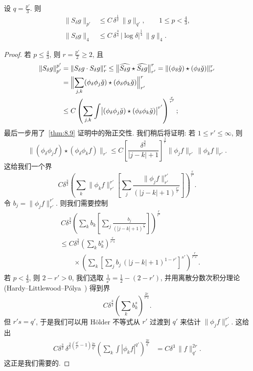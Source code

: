 \begin{theorem}\label{thm:8.11}
设 $q=\frac{p'}{3}$. 则
\begin{align*}
\|S_{\delta}g\|_{p'}&\leq C\,\delta^{\frac{1}{q}}\,\|g\|_{q'},\qquad 1\leq p<\frac{4}{3}, \\
\|S_{\delta}g\|_{4}&\leq C\,\delta^{\frac{3}{4}}\,|\log\delta|^{\frac{1}{4}}\,\|g\|_{4}.
\end{align*}
\end{theorem}

\begin{proof}
若 $p\leq\frac{4}{3}$, 则 $r=\frac{p'}{2}\geq 2$, 且
\begin{align*}
\|S_{\delta}g\|_{p'}^{p'}
&=\|S_{\delta}g\cdot S_{\delta}g\|_{r}^{r}
\leq\bigl\|\widehat{S_{\delta}g}\star\widehat{S_{\delta}g}\bigr\|_{r'}^{r}
=\|(\phi_{\delta}\check{g})\star(\phi_{\delta}\check{g})\|_{r'}^{r} \\
&=\Bigl\|\sum_{j,k}(\phi_{\delta}\phi_{j}\check{g})\star(\phi_{\delta}\phi_{k}\check{g})\Bigr\|_{r'}^{r} \\
&\leq C\left(\sum_{j,k}\int\bigl|(\phi_{\delta}\phi_{j}\check{g})\star(\phi_{\delta}\phi_{k}\check{g})\bigr|^{r'}\right)^{\frac{r}{r'}};
\end{align*}
最后一步用了~\ref*{thm:8.9} 证明中的殆正交性. 我们稍后将证明: 若 $1\leq r'\leq\infty$, 则
\[
\bigl\|(\phi_{\delta}\phi_{j}f)\star(\phi_{\delta}\phi_{k}f)\bigr\|_{r'}
\leq C\left[\frac{\delta^{\frac{3}{2}}}{|j-k|+1}\right]^{\frac{1}{r}}\|\phi_{j}f\|_{r'}\,\|\phi_{k}f\|_{r'}.
\]
这给我们一个界
\[
C\delta^{\frac{3}{2}}\left(\sum_{k}\|\phi_{k}f\|_{r'}^{r'}\left[\sum_{j}\frac{\|\phi_{j}f\|_{r'}^{r'}}{(|j-k|+1)^{\frac{r'}{r}}}\right]\right)^{\frac{r}{r'}}.
\]
令 $b_j=\|\phi_jf\|_{r'}^{r'}$. 则我们需要控制
\begin{align*}
&\,C\delta^{\frac{3}{2}}\left(\sum_{k}b_{k}\left[\sum_{j}\frac{b_{j}}{(|j-k|+1)^{\frac{r'}{r}}}\right]\right)^{\frac{r}{r'}} \\
&\leq C\delta^{\frac{3}{2}}\left(\sum_{k}b_{k}^{s}\right)^{\frac{r}{r's}} \\
&\qquad\times\left(\sum_{k}\left[\sum_{j}b_{j}\,(|j-k|+1)^{1-r'}\right]^{s'}\right)^{\frac{r}{r's'}}.
\end{align*}
若 $p<\frac{4}{3}$, 则 $2-r'>0$, 我们选取 $\frac{1}{s'}=\frac{1}{2}-(2-r')$, 并用离散分数次积分理论 (Hardy--Littlewood--P\'olya~\cite{hardy-littlewood-polya}) 得到界
\[
C\delta^{\frac{3}{2}}\left(\sum_{k}b_{k}^{s}\right)^{\frac{2r}{r's}}.
\]
但 $r's=q'$, 于是我们可以用 H\"older 不等式从 $r'$ 过渡到 $q'$ 来估计 $\|\phi_jf\|_{r'}^{r'}$. 这给出
\begin{align*}
C\delta^{\frac{3}{2}}\,\delta^{\frac{3}{2}\left(\frac{q'}{r'}-1\right)\frac{2r}{q'}}\left(\sum_{k}\int|\phi_{k}f|^{q'}\right)^{\frac{2r}{q'}}
&=C\delta^{3}\,\|f\|_{q'}^{2r}.
\end{align*}
这正是我们需要的.


\end{proof}
